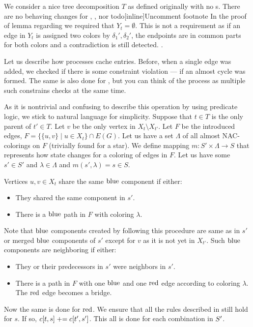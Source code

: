 We consider a nice tree decomposition \( T \) as defined originally
with no \IntroduceEdgeNode{}s.
There are no behaving changes for
\LeafNode{}, \RootNode{}, \ForgetVertexNode{} nor \JoinNode{}
todo[inline]{Uncomment footnote}{
		In the proof of lemma 
		regarding \JoinNode{} we required that \( Y_t = \emptyset \).
		This is not a requirement as if an edge in \( Y_t \) is assigned two colors
		by \( \delta_1', \delta_2' \), the endpoints are in common parts for both colors
		and a contradiction is still detected.
	}.

Let us describe how \IntroduceVertexWithEdgesNode{} processes cache entries.
Before, when a single edge was added,
we checked if there is some constraint violation
--- if an almost cycle was formed.
The same is also done for \IntroduceVertexWithEdgesNode{},
but you can think of the process as
multiple such constrains checks at the same time.

As it is nontrivial and confusing to describe this operation
by using predicate logic, we stick to natural language for simplicity.
Suppose that \( t \in T \) is
the only parent of \( t' \in T \).
Let \( v \) be the only vertex in \( X_t \setminus X_{t'} \).
Let \( F \) be the introduced edges,
\( F = \{ \{ u, v \} \mid u \in X_t \} \cap E(G) \).
%
Let us have a set \( \Lambda \) of all almost NAC-colorings on \( F \)
(trivially found for a star).
We define mapping \( m: S' \times \Lambda \to S \)
that represents how state changes for a coloring of edges in \( F \).
Let us have some \( s' \in S' \) and \( \lambda \in \Lambda \)
and \( m(s', \lambda) = s \in S \).

Vertices \( u, v \in X_t \) share the same \( \text{blue} \) component if either:
%
\begin{itemize}
	\item They shared the same component in \( s' \).
	\item There is a \( \text{blue} \) path in \( F \) with coloring \( \lambda \).
\end{itemize}
%
Note that \( \text{blue} \) components created by following this procedure
are same as in \( s' \) or merged \( \text{blue} \) components of \( s' \)
except for \( v \) as it is not yet in \( X_{t'} \).
Such \( \text{blue} \) components are neighboring if either:
%
\begin{itemize}
	\item They or their predecessors in \( s' \)
	      were neighbors in \( s' \).
	\item There is a path in \( F \) with
	      one \( \text{blue} \) and one \( \text{red} \) edge
	      according to coloring \( \lambda \).
	      The \( \text{red} \) edge becomes a bridge.
\end{itemize}
%
Now the same is done for \( \text{red} \).
We ensure that all the rules described in \IntroduceEdgeNode{}
still hold for \( s \). If so, \( c[t, s] \mathrel{+}= c[t', s'] \).
This all is done for each combination in \( S' \time \Lambda \).

